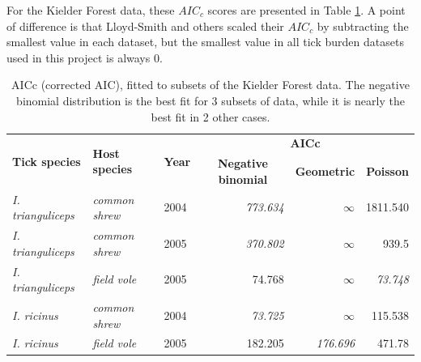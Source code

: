 \documentclass{article}
\begin{document}
For the Kielder Forest data, these $ AIC_c $ scores are presented in Table \ref{tab:kielderAIC}. A point of difference is that Lloyd-Smith and others scaled their $AIC_c $ by subtracting the smallest value in each dataset, but the smallest value in all tick burden datasets used in this project is always $ 0 $.

\begin{table}[ht]
	\begin{mdframed}[backgroundcolor=grey250,rightline=false,leftline=false,topline=false]
	\centering
	\begin{tabular}{|l|l|l|rrr|}
		\hline
		\multirow{2}{*}{\textbf{Tick species}} & \multirow{2}{*}{\textbf{Host species}} & \multirow{2}{*}{\textbf{Year}} & \multicolumn{3}{c|}{\textbf{AICc}}                                                                                                \\ \cline{4-6} 
		&                                        &                                & \multicolumn{1}{c|}{\textbf{Negative binomial}} & \multicolumn{1}{c|}{\textbf{Geometric}} & \multicolumn{1}{c|}{\textbf{Poisson}} \\ \hline
		\textit{I. trianguliceps}              & \textit{common shrew}                  & 2004                           & \multicolumn{1}{r|}{\textit{773.634}}           & \multicolumn{1}{r|}{$\infty$}           & 1811.540                              \\ \hline
		\textit{I. trianguliceps}              & \textit{common shrew}                  & 2005                           & \multicolumn{1}{r|}{\textit{370.802}}           & \multicolumn{1}{r|}{$\infty$}           & 939.5                                 \\ \hline
		\textit{I. trianguliceps}              & \textit{field vole}                    & 2005                           & \multicolumn{1}{r|}{74.768}                     & \multicolumn{1}{r|}{$\infty$}           & \textit{73.748}                       \\ \hline
		\textit{I. ricinus}                    & \textit{common shrew}                  & 2004                           & \multicolumn{1}{r|}{\textit{73.725}}            & \multicolumn{1}{r|}{$\infty$}           & 115.538                               \\ \hline
		\textit{I. ricinus}                    & \textit{field vole}                    & 2005                           & \multicolumn{1}{r|}{182.205}                    & \multicolumn{1}{r|}{\textit{176.696}}   & 471.78                                \\ \hline
	\end{tabular}
	\caption{AICc (corrected AIC), fitted to subsets of the Kielder Forest data. The negative binomial distribution is the best fit for 3 subsets of data, while it is nearly the best fit in 2 other cases.}
	\label{tab:kielderAIC}
	\end{mdframed}
\end{table}
\end{document}
